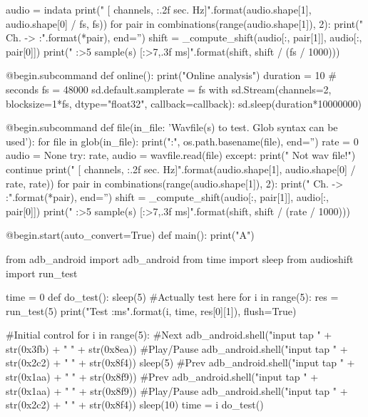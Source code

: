 \begin{mdframed}
\begin{python}
    audio = indata
    print("  [{} channels, {:.2f} sec. {} Hz]".format(audio.shape[1], audio.shape[0] / fs, fs))
    for pair in combinations(range(audio.shape[1]), 2):
        print("  Ch. {} -> {}:".format(*pair), end='')
        shift = _compute_shift(audio[:, pair[1]], audio[:, pair[0]])
        print(" {:>5} sample(s) [{:>7,.3f} ms]".format(shift, shift / (fs / 1000)))

@begin.subcommand
def online():
    print("Online analysis")
    duration = 10 # seconds
    fs = 48000
    sd.default.samplerate = fs
    with sd.Stream(channels=2, blocksize=1*fs, dtype="float32", callback=callback):
        sd.sleep(duration*10000000)

@begin.subcommand
def file(in_file: 'Wavfile(s) to test. Glob syntax can be used'):
    for file in glob(in_file):
        print("\nFile:", os.path.basename(file), end='')
        rate = 0
        audio = None
        try:
            rate, audio = wavfile.read(file)
        except:
            print("  Not wav file!")
            continue
        print("  [{} channels, {:.2f} sec. {} Hz]".format(audio.shape[1], audio.shape[0] / rate, rate))
        for pair in combinations(range(audio.shape[1]), 2):
            print("  Ch. {} -> {}:".format(*pair), end='')
            shift = _compute_shift(audio[:, pair[1]], audio[:, pair[0]])
            print(" {:>5} sample(s) [{:>7,.3f} ms]".format(shift, shift / (rate / 1000)))

@begin.start(auto_convert=True)
def main():
    print("A")
    \end{python}
    \label{mainmagic}
\end{mdframed}
\clearpage

\begin{mdframed}
    \begin{python}
from adb_android import adb_android
from time import sleep
from audioshift import run_test

time = 0
def do_test():
    sleep(5)
    #Actually test here
    for i in range(5):
        res = run_test(5)
        print("Test {} {}:{}ms".format(i, time, res[0][1]), flush=True)

#Initial control
for i in range(5):
    #Next
    adb_android.shell("input tap " + str(0x3fb) + " " + str(0x8ea))
    #Play/Pause
    adb_android.shell("input tap " + str(0x2c2) + " " + str(0x8f4))
    sleep(5)
    #Prev
    adb_android.shell("input tap " + str(0x1aa) + " " + str(0x8f9))
    #Prev
    adb_android.shell("input tap " + str(0x1aa) + " " + str(0x8f9))
    #Play/Pause
    adb_android.shell("input tap " + str(0x2c2) + " " + str(0x8f4))
    sleep(10)
    time = i
    do_test()
    \end{python}
    \label{soundseeder_next}
\end{mdframed}
\clearpage

